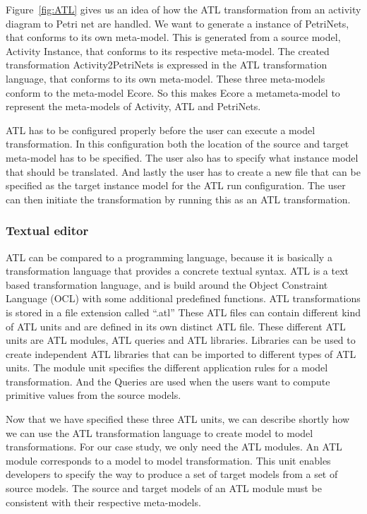Figure~\ref{fig:ATL} gives us an idea of how the ATL transformation from an activity
diagram to Petri net are handled. We want to generate a instance of PetriNets,
that conforms to its own meta-model. This is generated from a source
model, Activity Instance, that conforms to its respective meta-model.
The created transformation Activity2PetriNets is expressed in the ATL
transformation  language, that conforms to its own meta-model. These three
meta-models conform to the meta-model Ecore. So this makes Ecore a metameta-model
to represent the meta-models of Activity, ATL and PetriNets.

ATL has to be configured properly before the user can execute a model
transformation. In this configuration both the location of the source and target
meta-model has to be specified. The user also has to specify what instance model
that should be translated. And lastly the user has to create a new file that can
be specified as the target instance model for the ATL run configuration. The
user can then initiate the transformation by running this as an ATL
transformation.


\subsubsection*{Textual editor}

ATL can be compared to a programming language, because it is
basically a transformation language that provides a concrete textual syntax. ATL
is a text based transformation language, and is build around the Object
Constraint Language (OCL) \cite{OCL} with some additional predefined functions.
ATL transformations is stored in a file extension called ``.atl'' These ATL
files can contain different kind of ATL units and are defined in its own
distinct ATL file. These different ATL units are ATL modules, ATL queries and
ATL libraries. Libraries can be used to create independent ATL libraries that
can be imported to different types of ATL units. The module unit specifies the
different application rules for a  model transformation. And the Queries are
used when the users want to compute primitive values from the source models.

Now that we have specified these three ATL units, we can describe shortly how
we can use the ATL transformation language to create model to model
transformations. For our case study, we only need the ATL modules. An ATL module
corresponds to a model to model transformation. This unit enables developers to
specify the way to produce a set of target models from a set of source models.
The source and target models of an ATL module must be consistent with their
respective meta-models. 

